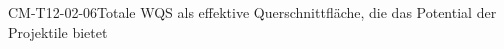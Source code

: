 
\begin{CONC}{CM-T12-02-06}{Totale WQS als effektive Querschnittfläche, die das Potential der Projektile bietet}
\end{CONC}

